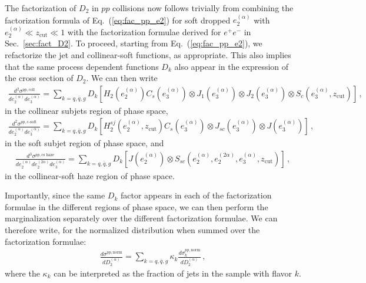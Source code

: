 \documentclass[a4paper,11pt]{article}
\newcommand{\ecf}[2]{e_{#1}^{(#2)}}
\def\zcut{z_{\text{cut}}}
\newcommand{\Dobs}[2]{D_{#1}^{(#2)}}
\DeclareRobustCommand{\Sec}[1]{Sec.~\ref{#1}}
\DeclareRobustCommand{\Eq}[1]{Eq.~(\ref{#1})}
\begin{document}
The factorization of $D_2$ in $pp$ collisions now follows trivially from combining the factorization formula of \Eq{eq:fac_pp_e2} for soft dropped $\ecf{2}{\alpha}$ with $\ecf{2}{\alpha} \ll \zcut \ll 1$ with the factorization formulae derived for $e^+e^-$ in \Sec{sec:fact_D2}.  To proceed, starting from \Eq{eq:fac_pp_e2}, we refactorize the jet and collinear-soft functions, as appropriate.
This also implies that the same process dependent functions $D_k$ also appear in the expression of the cross section of $D_2$.  We can then write
\begin{align}\label{eq:fac_pp_coll}
\frac{d^2\sigma^{pp,\text{coll}}}{d\ecf{2}{\alpha} d\ecf{3}{\alpha}}=\sum\limits_{k=q,\bar q, g}D_k  \left[  H_{2}(\ecf{2}{\alpha})C_s(\ecf{3}{\alpha})\otimes J_1(\ecf{3}{\alpha})\otimes J_2(\ecf{3}{\alpha}) \otimes S_c(\ecf{3}{\alpha}, \zcut)  \right]\,,
\end{align}
in the collinear subjets region of phase space,  
\begin{align}\label{eq:fac_pp_cs}
\frac{d^2\sigma^{pp,\text{c-soft}}}{d\ecf{2}{\alpha} d\ecf{3}{\alpha}}=\sum\limits_{k=q,\bar q, g}D_k  \left[  H_{2}^{sj}(\ecf{2}{\alpha},\zcut )C_s(\ecf{3}{\alpha})\otimes J_{sc}(\ecf{3}{\alpha})\otimes J(\ecf{3}{\alpha})  \right]\,,
\end{align}
in the soft subjet region of phase space, and
\begin{align}\label{eq:fac_pp_cshaze}
\frac{d^3\sigma^{pp,\text{cs haze}}}{d\ecf{2}{\alpha} d\ecf{2}{2\alpha} d\ecf{3}{\alpha}}=\sum\limits_{k=q,\bar q, g}D_k  \left[  J(\ecf{2}{\alpha}) \otimes S_{sc}(\ecf{2}{\alpha},\ecf{2}{2\alpha}, \ecf{3}{\alpha}, \zcut)  \right]\,,
\end{align}
in the collinear-soft haze region of phase space.

Importantly, since the same $D_k$ factor appears in each of the factorization formulae in the different regions of phase space,  we can then perform the marginalization separately over the different factorization formulae. We can therefore write, for the normalized distribution when summed over the factorization formulae:
\begin{align}
\frac{d\sigma^{pp, \text{norm}}}{d\Dobs{2}{\alpha}}=\sum\limits_{k=q,\bar q, g} \kappa_k   \frac{d\sigma_k^{pp, \text{norm}}}{d\Dobs{2}{\alpha}}\,,
\end{align}
where the $\kappa_k$ can be interpreted as the fraction of jets in the sample with flavor $k$. 




\end{document}
